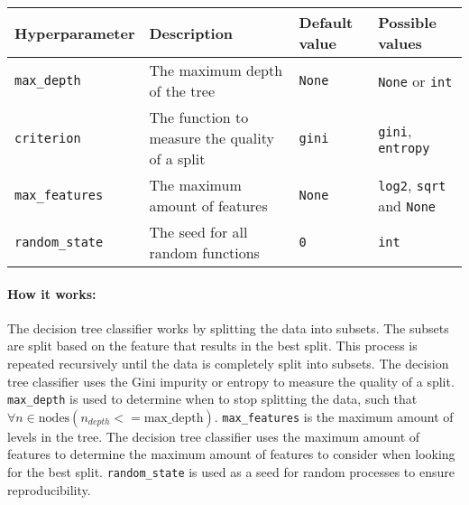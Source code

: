 \documentclass[11pt]{article}
\begin{document}
\begin{longtable}[]{@{}
  >{\raggedright\arraybackslash}p{}
  >{\raggedright\arraybackslash}p{}
  >{\raggedright\arraybackslash}p{}
  >{\raggedright\arraybackslash}p{}@{}}
\toprule\noalign{}
\begin{minipage}[b]{\linewidth}\raggedright
Hyperparameter
\end{minipage} & \begin{minipage}[b]{\linewidth}\raggedright
Description
\end{minipage} & \begin{minipage}[b]{\linewidth}\raggedright
Default value
\end{minipage} & \begin{minipage}[b]{\linewidth}\raggedright
Possible values
\end{minipage} \\
\midrule\noalign{}
\endhead
\bottomrule\noalign{}
\endlastfoot
\texttt{max\_depth} & The maximum depth of the tree & \texttt{None} &
\texttt{None} or \texttt{int} \\
\texttt{criterion} & The function to measure the quality of a split &
\texttt{gini} & \texttt{gini}, \texttt{entropy} \\
\texttt{max\_features} & The maximum amount of features & \texttt{None}
& \texttt{log2}, \texttt{sqrt} and \texttt{None} \\
\texttt{random\_state} & The seed for all random functions & \texttt{0}
& \texttt{int} \\
\end{longtable}

\paragraph{How it works:}\label{how-it-works}

The decision tree classifier works by splitting the data into subsets.
The subsets are split based on the feature that results in the best
split. This process is repeated recursively until the data is completely
split into subsets. The decision tree classifier uses the Gini impurity
or entropy to measure the quality of a split. \texttt{max\_depth} is
used to determine when to stop splitting the data, such that
\(\forall n \in \text{nodes} (n_{depth} <= \text{max\char`_depth} )\).
\texttt{max\_features} is the maximum amount of levels in the tree. The
decision tree classifier uses the maximum amount of features to
determine the maximum amount of features to consider when looking for
the best split. \texttt{random\_state} is used as a seed for random
processes to ensure reproducibility.
\end{document}
